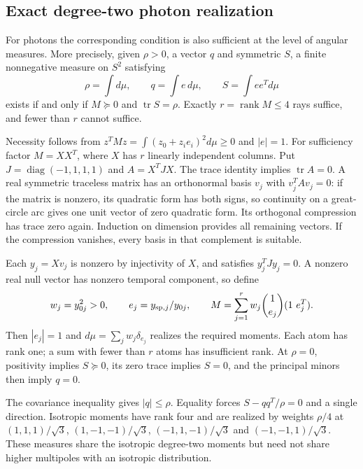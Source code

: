 \subsection{Exact degree-two photon realization}
\label{geo:photon_realization}
For photons the corresponding condition is also sufficient at the level of angular measures. More precisely, given $\rho>0$, a vector $q$ and symmetric $S$, a finite nonnegative measure on $S^2$ satisfying
\begin{equation}
 \rho=\int d\mu,\qquad q=\int e\,d\mu,\qquad
 S=\int ee^T d\mu
 \label{geo:photon_moments}
\end{equation}
exists if and only if $M\succeq0$ and $\operatorname{tr}S=\rho$. Exactly $r=\operatorname{rank}M\le4$ rays suffice, and fewer than $r$ cannot suffice.

Necessity follows from $z^TMz=\int(z_0+z_i e_i)^2d\mu\ge0$ and $|e|=1$. For sufficiency factor $M=XX^T$, where $X$ has $r$ linearly independent columns. Put $J=\operatorname{diag}(-1,1,1,1)$ and $A=X^TJX$. The trace identity implies $\operatorname{tr}A=0$. A real symmetric traceless matrix has an orthonormal basis $v_j$ with $v_j^TAv_j=0$: if the matrix is nonzero, its quadratic form has both signs, so continuity on a great-circle arc gives one unit vector of zero quadratic form. Its orthogonal compression has trace zero again. Induction on dimension provides all remaining vectors. If the compression vanishes, every basis in that complement is suitable.

Each $y_j=Xv_j$ is nonzero by injectivity of $X$, and satisfies $y_j^TJy_j=0$. A nonzero real null vector has nonzero temporal component, so define
\begin{equation}
 w_j=y_{0j}^2>0,\qquad e_j=y_{{\rm sp},j}/y_{0j},\qquad
 M=\sum_{j=1}^r w_j\binom1{e_j}(1\ e_j^T).
 \label{geo:photon_construction}
\end{equation}
Then $|e_j|=1$ and $d\mu=\sum_jw_j\delta_{e_j}$ realizes the required moments. Each atom has rank one; a sum with fewer than $r$ atoms has insufficient rank. At $\rho=0$, positivity implies $S\succeq0$, its zero trace implies $S=0$, and the principal minors then imply $q=0$.

The covariance inequality gives $|q|\le\rho$. Equality forces $S-qq^T/\rho=0$ and a single direction. Isotropic moments have rank four and are realized by weights $\rho/4$ at
$(1,1,1)/\sqrt3$, $(1,-1,-1)/\sqrt3$, $(-1,1,-1)/\sqrt3$ and $(-1,-1,1)/\sqrt3$.
These measures share the isotropic degree-two moments but need not share higher multipoles with an isotropic distribution.

